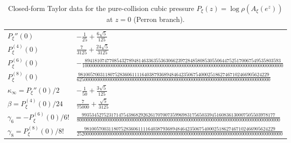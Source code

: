 \begin{table}[H]
\centering
\scriptsize
\setlength{\tabcolsep}{6pt}
\caption{Closed-form Taylor data for the pure-collision cubic pressure $P_\xi(z)=\log\rho(A_\xi(e^{z}))$ at $z=0$ (Perron branch).}
\label{tab:arity_pure_collision_cubic_asymp_coeffs}
\begin{tabular}{l l}
\toprule
$P_\xi''(0)$ & $- \frac{1}{25} + \frac{6 \sqrt{5}}{125}$\\
$P_\xi^{(4)}(0)$ & $\frac{7}{3125} + \frac{24 \sqrt{5}}{3125}$\\
$P_\xi^{(6)}(0)$ & $- \frac{89418107477085432789481463363553630662397284858085305506447525170067549535803593}{1000000000000000000000000000000000000000000000000000000000000000000000000000000000}$\\
$P_\xi^{(8)}(0)$ & $\frac{981005700311807528360611116403879368948464235067540002518627467102466905624229}{6250000000000000000000000000000000000000000000000000000000000000000000000000000}$\\
$\kappa_\infty=P_\xi''(0)/2$ & $- \frac{1}{50} + \frac{3 \sqrt{5}}{125}$\\
$\beta=P_\xi^{(4)}(0)/24$ & $\frac{7}{75000} + \frac{\sqrt{5}}{3125}$\\
$\gamma_6=-P_\xi^{(6)}(0)/6!$ & $\frac{9935345275231714754386829262617070073599698317565033945160836130007505503978177}{80000000000000000000000000000000000000000000000000000000000000000000000000000000000}$\\
$\gamma_8=P_\xi^{(8)}(0)/8!$ & $\frac{981005700311807528360611116403879368948464235067540002518627467102466905624229}{252000000000000000000000000000000000000000000000000000000000000000000000000000000000}$\\
\bottomrule
\end{tabular}
\end{table}
